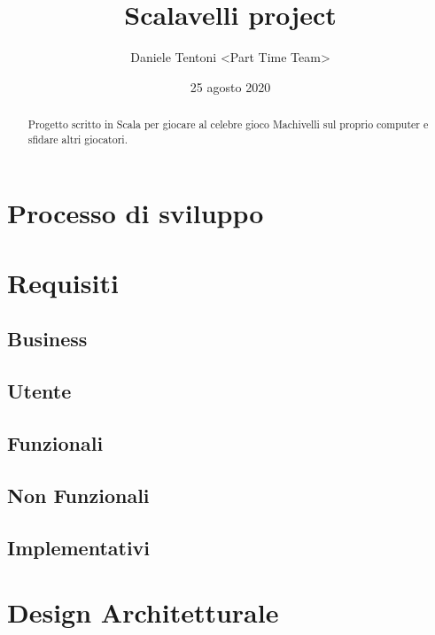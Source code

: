 \documentclass{article}
\title{Scalavelli project}
\date{25 agosto 2020}
\author{Daniele Tentoni <Part Time Team>}
\begin{document}
    \maketitle
	\newpage

    \begin{abstract}
        Progetto scritto in Scala per giocare al celebre gioco Machivelli sul proprio computer e sfidare altri giocatori.
    \end{abstract}

    \tableofcontents
    
    \section{Processo di sviluppo}

	\newpage

    \section{Requisiti}

        \subsection{Business}

        \subsection{Utente}

        \subsection{Funzionali}

        \subsection{Non Funzionali}

        \subsection{Implementativi}

	\newpage
    
    \section{Design Architetturale}
\end{document}
